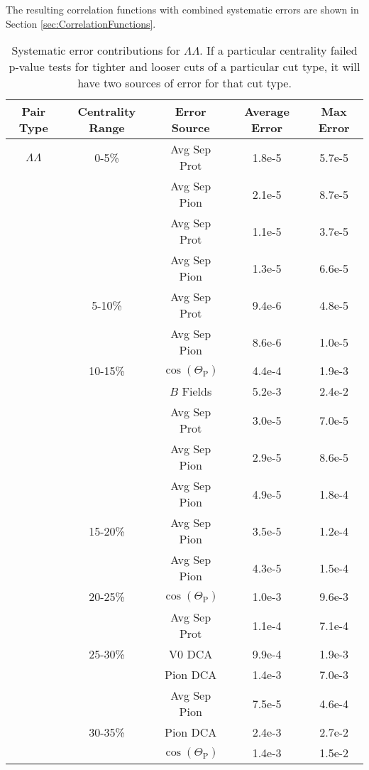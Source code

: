 The resulting correlation functions with combined systematic errors are shown in Section \ref{sec:CorrelationFunctions}.

\begin{table}
\caption[Systematic error contributions for $\Lambda\Lambda$] {Systematic error contributions for $\Lambda\Lambda$.  If a particular centrality failed p-value tests for tighter and looser cuts of a particular cut type, it will have two sources of error for that cut type.} \label{tab:SysErrorSourcesLL} 
\begin{center}
\begin{tabular}{| c | c | c | c | c |}
  \hline                       
  Pair Type & Centrality Range & Error Source & Average Error & Max Error \\
  \hline
  $\Lambda\Lambda$ & 0-5\% & Avg Sep Prot & 1.8e-5 & 5.7e-5 \\
   &         & Avg Sep Pion & 2.1e-5 & 8.7e-5 \\
   &         & Avg Sep Prot & 1.1e-5 & 3.7e-5 \\
   &         & Avg Sep Pion & 1.3e-5 & 6.6e-5 \\
   & 5-10\%  & Avg Sep Prot & 9.4e-6 & 4.8e-5 \\
   &         & Avg Sep Pion & 8.6e-6 & 1.0e-5 \\
   & 10-15\% & $\cos(\Theta_{\mathrm{P}})$ & 4.4e-4 & 1.9e-3 \\
   &         & $B$ Fields & 5.2e-3 & 2.4e-2 \\
   &         & Avg Sep Prot & 3.0e-5 & 7.0e-5 \\
   &         & Avg Sep Pion & 2.9e-5 & 8.6e-5 \\
   &         & Avg Sep Pion & 4.9e-5 & 1.8e-4 \\
   & 15-20\% & Avg Sep Pion & 3.5e-5 &  1.2e-4 \\
   &         & Avg Sep Pion & 4.3e-5 & 1.5e-4 \\
   & 20-25\% & $\cos(\Theta_{\mathrm{P}})$ & 1.0e-3 & 9.6e-3 \\
   &         & Avg Sep Prot & 1.1e-4 & 7.1e-4 \\
   & 25-30\% & V0 DCA & 9.9e-4 & 1.9e-3\\
   &	         & Pion DCA & 1.4e-3 & 7.0e-3\\
   &         & Avg Sep Pion & 7.5e-5 & 4.6e-4 \\
   & 30-35\% & Pion DCA & 2.4e-3 & 2.7e-2 \\
   &         & $\cos(\Theta_{\mathrm{P}})$ & 1.4e-3 & 1.5e-2 \\

\end{tabular}
\end{center}
\end{table}
